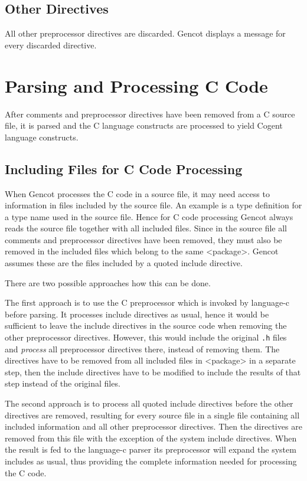 \documentclass[a4paper]{report}
\newcommand{\code}[1]{\textnormal{\texttt{#1}}}
\begin{document}
\subsection{Other Directives}

All other preprocessor directives are discarded. Gencot displays a message for every discarded directive.

\section{Parsing and Processing C Code}

After comments and preprocessor directives have been removed from a C source file, it is parsed and
the C language constructs are processed to yield Cogent language constructs. 

\subsection{Including Files for C Code Processing}

When Gencot processes the C code in a source file, it may need access to information in files included by
the source file. An example is a type definition for a type name used in the source file. Hence for
C code processing Gencot always reads the source file together with all included files. Since in the source
file all comments and preprocessor directives have been  removed, they must also be removed in the included files
which belong to the same <package>. Gencot assumes these are the files included by a quoted include directive.

There are two possible approaches how this can be done.

The first approach is to use the C preprocessor which is invoked by language-c before parsing. It processes
include directives as usual, hence it would be sufficient to leave the include directives in the source code
when removing the other preprocessor directives. However, this would include the original \code{.h} files and
\textit{process} all preprocessor directives there, instead of removing them. The directives have to be 
removed from all included files in <package> in a separate step, then the include directives have to be modified to include
the results of that step instead of the original files.

The second approach is to process all quoted include directives before the other directives are removed, 
resulting for every source
file in a single file containing all included information and all other preprocessor directives. Then the directives
are removed from this file with the exception of the system include directives. When the result is fed to the 
language-c parser its preprocessor will expand the system includes as usual, thus providing the complete 
information needed for processing the C code.
\end{document}
